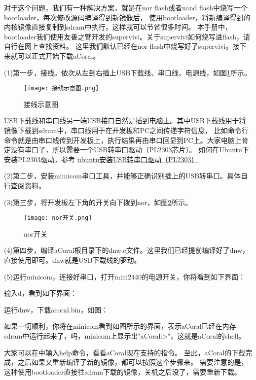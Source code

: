 对于这个问题，我们有一种解决方案，就是在nor flash或者nand flash中烧写一个bootloader，每次修改源码编译得到新镜像后，
使用bootloader，将新编译得到的内核镜像直接复制到sdram中执行，这样就可以节省很多时间。
本手册中，bootloader我们使用友善之臂开发的supervivi。关于supervivi如何烧写进flash，请自行在网上查找资料。
这里我们默认已经在nor flash中烧写好了supervivi。接下来就可以正式开始下载aCoral。

(1)第一步，接线。依次从左到右插上USB下载线、串口线、电源线，如图\ref{接线示意图}所示。
\begin{figure}[H]
	\texttt{[image: 接线示意图.png]}
	\caption{接线示意图}
	\label{接线示意图}
\end{figure}

USB下载线和串口线另一端USB接口自然是插到电脑上。其中USB下载线用于将镜像下载到sdram中，串口线用于在开发板和PC之间传递字符信息，
比如命令行命令就是由串口线传到开发板上，执行结果再由串口回显到PC上。大家电脑上肯定没有串口了，所以需要一个USB转串口驱动（PL2303芯片）。
如何在Ubuntu下安装PL2303驱动，参考 \href{https://blog.csdn.net/qq_34562093/article/details/75059251}{\underline{ubuntu安装USB转串口驱动（PL2303）}}

(2)第二步，安装mimicom串口工具，并能够正确识别插上的USB转串口。具体自行查阅资料。

(3)第三步，将开发板左下角的开关向下拨到nor，如图\ref{nor开关}所示。
\begin{figure}[H]
	\texttt{[image: nor开关.png]}
	\caption{nor开关}
	\label{nor开关}
\end{figure}

(4)第四步，编译aCoral根目录下的dnw.c文件。这里我们已经提前编译好了dnw，直接使用即可。dnw就是USB下载线的驱动。

(5)运行minicom，连接好串口，打开mini2440的电源开关，你将看到如下界面：

输入d，看到如下界面：

运行dnw，下载acoral.bin，如图：

如果一切顺利，你将在minicom看到如图所示的界面，表示aCoral已经在内存sdram中运行起来了，吗，minicom上显示出"aCoral:>"，这就是aCoral的shell。

大家可以在中输入help命令，看看aCoral现在支持的指令。
至此，aCoral的下载完成，之后如果又重新编译了新的镜像，都可以按照这个步骤来。
需要注意的是，这种使用bootloader直接往sdram下载的镜像，关机之后没了，需要重新下载。